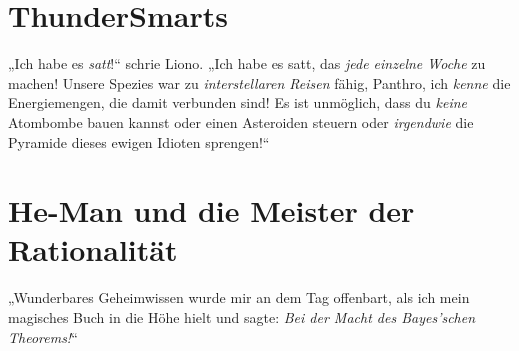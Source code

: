 \section{ThunderSmarts}

„Ich habe es \emph{satt}!“ schrie Liono.
„Ich habe es satt, das \emph{jede einzelne Woche} zu machen! Unsere Spezies war zu \emph{interstellaren Reisen} fähig, Panthro, ich \emph{kenne} die Energiemengen, die damit verbunden sind! Es ist unmöglich, dass du \emph{keine} Atombombe bauen kannst oder einen Asteroiden steuern oder \emph{irgendwie} die Pyramide dieses ewigen Idioten sprengen!“

\section{He-Man und die Meister der Rationalität}

„Wunderbares Geheimwissen wurde mir an dem Tag offenbart, als ich mein magisches Buch in die Höhe hielt und sagte: \emph{Bei der Macht des Bayes’schen Theorems!}“

